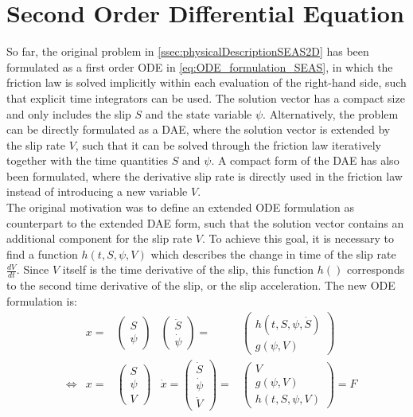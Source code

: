\section{Second Order Differential Equation}
So far, the original problem in \autoref{ssec:physicalDescriptionSEAS2D} has been formulated as a first order ODE in \autoref{eq:ODE_formulation_SEAS}, in which the friction law is solved implicitly within each evaluation of the right-hand side, such that explicit time integrators can be used. The solution vector has a compact size and only includes the slip $S$ and the state variable $\psi$. Alternatively, the problem can be directly formulated as a DAE, where the solution vector is extended by the slip rate $V$, such that it can be solved through the friction law iteratively together with the time quantities $S$ and $\psi$. A compact form of the DAE has also been formulated, where the derivative slip rate is directly used in the friction law instead of introducing a new variable $V$. \\
The original motivation was to define an extended ODE formulation as counterpart to the extended DAE form, such that the solution vector contains an additional component for the slip rate $V$. To achieve this goal, it is necessary to find a function $h(t,S,\psi,V)$ which describes the change in time of the slip rate $\frac{dV}{dt}$. Since $V$ itself is the time derivative of the slip, this function $h()$ corresponds to the second time derivative of the slip, or the slip acceleration. The new ODE formulation is: 
\begin{align}
&&	 x      =& \begin{pmatrix}	S                     \\ \psi           \end{pmatrix}      &
	 		   \begin{pmatrix}	\ddot{S}              \\ \dot{\psi}     \end{pmatrix}
			=& \begin{pmatrix}	h(t,S,\psi,\dot{S})   \\ g(\psi, V)     \end{pmatrix}
			 	 		 \\ &\Leftrightarrow&	 		  		 
	 x      =& \begin{pmatrix}	S       \\ \psi       \\ V	            \end{pmatrix}      &
   	\dot{x}  = \begin{pmatrix}	\dot{S} \\ \dot{\psi} \\ \dot{V}        \end{pmatrix}
	 		=& \begin{pmatrix}	 V      \\ g(\psi, V) \\ h(t,S,\psi,V)  \end{pmatrix}
	 		 = F	
	\label{eq:2nd_order_ODE_formulation}
\end{align}

